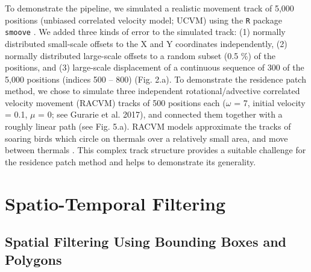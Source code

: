 \documentclass[10pt,paper=a4,headings=standardclasses
]{scrartcl}
\begin{document}
To demonstrate the pipeline, we simulated a realistic movement track of 5,000 positions (unbiased correlated velocity model; UCVM) using the \texttt{R} package \texttt{smoove} \citep[][see Fig. 2.a]{gurarie2017}.
We added three kinds of error to the simulated track: (1) normally distributed small-scale offsets to the X and Y coordinates independently, (2) normally distributed large-scale offsets to a random subset (0.5 \%) of the positions, and (3) large-scale displacement of a continuous sequence of 300 of the 5,000 positions (indices 500 -- 800) (Fig. 2.a).
To demonstrate the residence patch method, we chose to simulate three independent rotational/advective correlated velocity movement (RACVM) tracks of 500 positions each ($\omega$ = 7, initial velocity = 0.1, $\mu$ = 0; see Gurarie et al. 2017), and connected them together with a roughly linear path (see Fig. 5.a).
RACVM models approximate the tracks of soaring birds which circle on thermals over a relatively small area, and move between thermals \citep[`thermalling'; ][]{gurarie2017, harel2016}.
This complex track structure provides a suitable challenge for the residence patch method and helps to demonstrate its generality.

\section{Spatio-Temporal Filtering}

\subsection{Spatial Filtering Using Bounding Boxes and Polygons}
\end{document}
